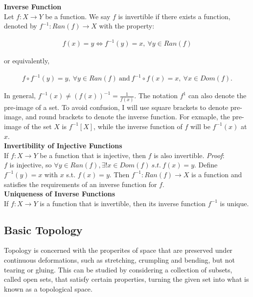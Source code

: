 \documentclass{article}
\numberwithin{theorem}{subsection}
\numberwithin{theorem}{subsubsection}
\theoremstyle{definition}
\numberwithin{definition}{subsection}
\numberwithin{definition}{subsubsection}
\begin{document}
\noindent \textbf{Inverse Function} \\
\indent Let $f:X \rightarrow Y$ be a function. We say $f$ is invertible if there exists a function, denoted by $f^{-1}:Ran(f) \rightarrow X$ with the property:

\begin{gather*}
    f(x) = y \iff f^{-1}(y) = x,\ \forall y \in Ran(f)
\end{gather*}

\noindent or equivalently,

\begin{gather*}
    f \circ f^{-1}(y) = y,\ \forall y \in Ran(f)\ \text{and}\ f^{-1} \circ f(x) = x,\ \forall x \in Dom(f).
\end{gather*}

\indent In general, $f^{-1}(x) \neq (f(x))^{-1} = \frac{1}{f(x)}$. The notation $f^{1}$ can also denote the pre-image of a set. To avoid confusion, I will use square brackets to denote pre-image, and round brackets to denote the inverse function. For exmaple, the pre-image of the set $X$ is $f^{-1}[X]$, while the inverse function of $f$ will be $f^{-1}(x)$ at $x$. \\

\noindent \textbf{Invertibility of Injective Functions} \\
\indent If $f:X \rightarrow Y$ be a function that is injective, then $f$ is also invertible. \textit{Proof}:\\
$f$ is injective, so $\forall y \in Ran(f), \exists!x \in Dom(f)\ s.t.\ f(x) = y$. Define $f^{-1}(y) = x$ with $x$ s.t. $f(x) = y$. Then $f^{-1}: Ran(f) \rightarrow X$ is a function and satisfies the requirements of an inverse function for $f$. \\

\noindent \textbf{Uniqueness of Inverse Functions} \\
\indent If $f: X \rightarrow Y$ is a function that is invertible, then its inverse function $f^{-1}$ is unique.

\subsection{Basic Topology}
Topology is concerned with the properites of space that are preserved under continuous deformations, such as stretching, crumpling and bending, but not tearing or gluing. This can be studied by considering a collection of subsets, called open sets, that satisfy certain properties, turning the given set into what is known as a topological space. \\
\end{document}
